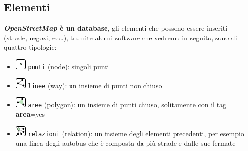 \documentclass[a4paper,twoside,12pt,]{article}
\newcommand{\osm}{\emph{OpenStreetMap}\xspace}
\newcommand{\key}[1]{\textsf{\textbf{#1}}}
\newcommand{\val}[1]{\textsf{#1}}
\begin{document}
\subsection{Elementi}
\textbf{\osm è un database}, gli elementi che possono essere inseriti (strade, negozi, ecc.), tramite alcuni software che vedremo in seguito, sono di quattro tipologie:
\begin{itemize}
 \item \includegraphics{./Mf_node.png} \texttt{punti} (node): singoli punti
 \item \includegraphics{./Mf_way.png} \texttt{linee} (way): un insieme di punti non chiuso
 \item \includegraphics{./Mf_area.png} \texttt{aree} (polygon): un insieme di punti chiuso, solitamente con il tag \key{area}=\val{yes}
 \item \includegraphics{./Mf_relation.png} \texttt{relazioni} (relation): un insieme degli elementi precedenti, per esempio una linea degli autobus che è composta da più strade e dalle sue fermate
\end{itemize}
\end{document}
